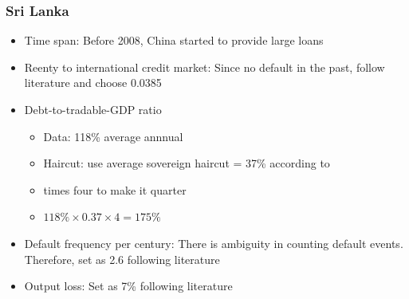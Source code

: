 \documentclass[mathserif]{beamer}
\begin{document}
    \begin{frame}
        \frametitle{Sri Lanka}
        \begin{itemize}
            \item Time span: Before 2008, China started to provide large loans
            \item Reenty to international credit market: Since no default in the past, follow literature and choose 0.0385
            \item Debt-to-tradable-GDP ratio
            \begin{itemize}
                \item Data: 118\% average annnual
                \item Haircut: use average sovereign haircut = 37\% according to \citet{Cruces-Trebesch-13}
                \item times four to make it quarter
                \item $118\% \times 0.37 \times 4 = 175\%$
            \end{itemize}
            \item Default frequency per century: There is ambiguity in counting default events. Therefore, set as 2.6 following literature
            \item Output loss: Set as 7\% following literature
        \end{itemize}

    \end{frame}
\end{document}
